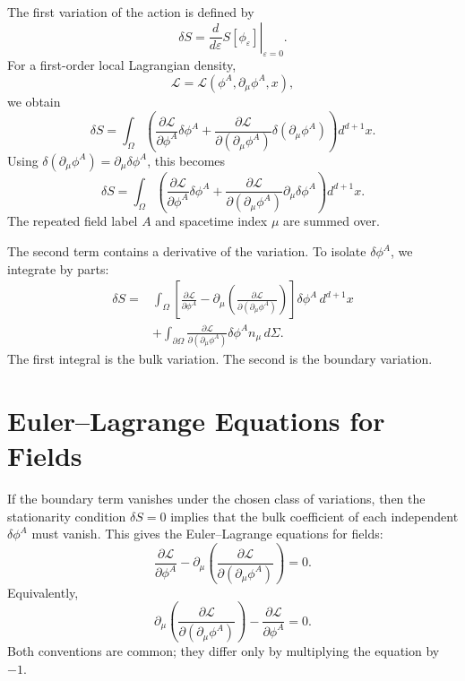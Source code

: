 The first variation of the action is defined by
\[
    \delta S
    =\left.\frac{d}{d\varepsilon}S[\phi_\varepsilon]\right|_{\varepsilon=0}.
\]
For a first-order local Lagrangian density,
\[
    \mathcal{L}=\mathcal{L}(\phi^A,\partial_\mu\phi^A,x),
\]
we obtain
\[
    \delta S
    =\int_\Omega\left(
        \frac{\partial\mathcal{L}}{\partial\phi^A}\delta\phi^A
        +\frac{\partial\mathcal{L}}{\partial(\partial_\mu\phi^A)}
        \delta(\partial_\mu\phi^A)
    \right)d^{d+1}x.
\]
Using \(\delta(\partial_\mu\phi^A)=\partial_\mu\delta\phi^A\), this becomes
\[
    \delta S
    =\int_\Omega\left(
        \frac{\partial\mathcal{L}}{\partial\phi^A}\delta\phi^A
        +\frac{\partial\mathcal{L}}{\partial(\partial_\mu\phi^A)}
        \partial_\mu\delta\phi^A
    \right)d^{d+1}x.
\]
The repeated field label \(A\) and spacetime index \(\mu\) are summed over.

The second term contains a derivative of the variation. To isolate
\(\delta\phi^A\), we integrate by parts:
\[
\begin{aligned}
    \delta S
    ={}&\int_\Omega\left[
        \frac{\partial\mathcal{L}}{\partial\phi^A}
        -\partial_\mu\left(
            \frac{\partial\mathcal{L}}{\partial(\partial_\mu\phi^A)}
        \right)
    \right]\delta\phi^A\,d^{d+1}x \\
    &+\int_{\partial\Omega}
        \frac{\partial\mathcal{L}}{\partial(\partial_\mu\phi^A)}
        \delta\phi^A n_\mu\,d\Sigma.
\end{aligned}
\]
The first integral is the bulk variation. The second is the boundary variation.

\section{Euler--Lagrange Equations for Fields}

If the boundary term vanishes under the chosen class of variations, then the
stationarity condition \(\delta S=0\) implies that the bulk coefficient of each
independent \(\delta\phi^A\) must vanish. This gives the Euler--Lagrange
equations for fields:
\[
    \frac{\partial\mathcal{L}}{\partial\phi^A}
    -\partial_\mu\left(
        \frac{\partial\mathcal{L}}{\partial(\partial_\mu\phi^A)}
    \right)=0.
\]
Equivalently,
\[
    \partial_\mu\left(
        \frac{\partial\mathcal{L}}{\partial(\partial_\mu\phi^A)}
    \right)
    -\frac{\partial\mathcal{L}}{\partial\phi^A}=0.
\]
Both conventions are common; they differ only by multiplying the equation by
\(-1\).

